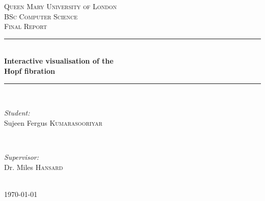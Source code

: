 \documentclass[12pt]{article} %
\begin{document}

\begin{titlepage}

\newcommand{\HRule}{\rule{\linewidth}{0.5mm}} %

\center %

\textsc{\LARGE Queen Mary University of London}\\[1.5cm] %
\textsc{\Large BSc Computer Science}\\[0.5cm] %
\textsc{\large Final Report}\\[0.5cm] %

\HRule \\[0.1cm]
{ \huge \bfseries Interactive visualisation of the\\[0.5cm] Hopf fibration}\\%
\HRule \\[1.5cm]

\begin{minipage}{0.4\textwidth}
\begin{flushleft} \large
\emph{Student:}\\
Sujeen Fergus \textsc{Kumarasooriyar} %
\end{flushleft}
\end{minipage}
~
\begin{minipage}{0.4\textwidth}
\begin{flushright} \large
\emph{Supervisor:} \\
Dr. Miles \textsc{Hansard} %
\end{flushright}
\end{minipage}\\[4cm]

{\large \today}\\[3cm] %


\vfill %

\end{titlepage}
\end{document}
